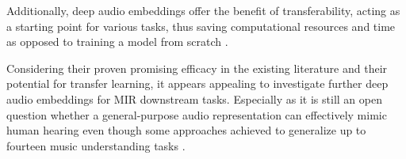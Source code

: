 Additionally, deep audio embeddings offer the benefit of transferability, acting as a starting point for various tasks, thus saving computational resources and time as opposed to training a model from scratch \cite{HamelTransferSimilarity}. 

Considering their proven promising efficacy in the existing literature and their potential for transfer learning, it appears appealing to investigate further deep audio embeddings for MIR downstream tasks. Especially as it is still an open question whether a general-purpose audio representation can effectively mimic human hearing \cite{Turian2022HEAR:Representations} even though some approaches achieved to generalize up to fourteen music understanding tasks \cite{Li2023MERT:Training}.
